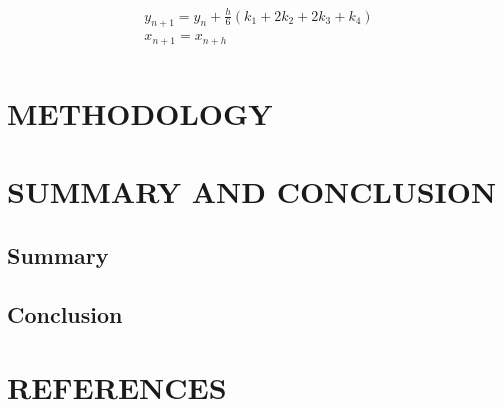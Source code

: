 \documentclass[11pt]{report}
\newcommand{\sps}{\\[0.2cm]}
\begin{document}
	\begin{gather}
		y_{n+1} = y_n+\frac{h}{6}(k_1+2k_2+2k_3+k_4)\sps
		x_{n+1} = x_{n+h}\sps
	\end{gather}
	
	
	
	
	
	
	
	
	
	
	
	
	
	
	
	
	
	
	
	
	
	
	
	
	
	
	
	
	
	
	
	
	
	\chapter{METHODOLOGY}
	\section{}
	
	
	
	
	
	\chapter{}
	
	



	
	\chapter{SUMMARY AND CONCLUSION}
	\section{Summary}
	
	
	\section{Conclusion}
	
	

	
	\chapter*{REFERENCES}
	
	\begin{description}
		\item 
	\end{description}
	
\end{document}

